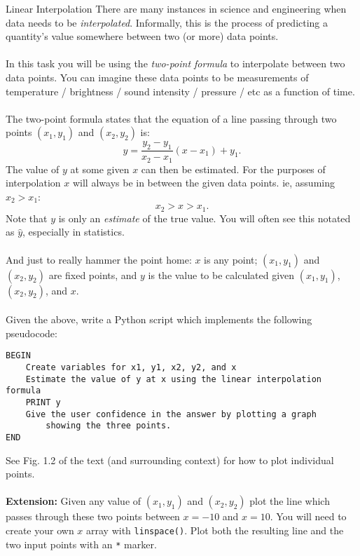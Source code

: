 \documentclass{lab}
\begin{document}
\begin{task}{Linear Interpolation}{}
There are many instances in science and engineering when data needs to be \textit{interpolated}. Informally, this is the process of predicting a quantity's value somewhere between two (or more) data points.
\\ \\
In this task you will be using the \textit{two-point formula} to interpolate between two data points. You can imagine these data points to be measurements of temperature / brightness / sound intensity / pressure / etc as a function of time.\\ \\
The two-point formula states that the equation of a line passing through two points $(x_1, y_1)$ and $(x_2, y_2)$ is:
\begin{equation}
y = \frac{y_2 - y_1}{x_2 - x_1}(x - x_1) + y_1.
\end{equation}
The value of $y$ at some given $x$ can then be estimated. For the purposes of interpolation $x$ will always be in between the given data points. ie, assuming $x_2 > x_1$:
\begin{equation}
x_2 > x > x_1.
\end{equation}
Note that $y$ is only an \textit{estimate} of the true value. You will often see this notated as $\hat{y}$, especially in statistics.
\\ \\
And just to really hammer the point home: $x$ is any point; $(x_1,y_1)$ and $(x_2, y_2)$ are fixed points, and $y$ is the value to be calculated given $(x_1,y_1)$, $(x_2, y_2)$, and $x$.
\\ \\
Given the above, write a Python script which implements the following pseudocode:
\begin{lstlisting}[style=pseudo]
BEGIN
	Create variables for x1, y1, x2, y2, and x
	Estimate the value of y at x using the linear interpolation formula
	PRINT y
	Give the user confidence in the answer by plotting a graph
		showing the three points.
END
\end{lstlisting}

See Fig. 1.2 of the text (and surrounding context) for how to plot individual points.
\\ \\
\textbf{Extension:} Given any value of $(x_1,y_1)$ and $(x_2, y_2)$ plot the line which passes through these two points between $x=-10$ and $x=10$. You will need to create your own $x$ array with \texttt{linspace()}. Plot both the resulting line and the two input points with an \texttt{*} marker.

\end{task}
\end{document}
